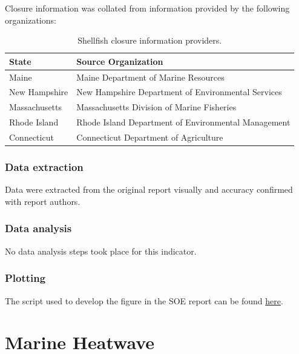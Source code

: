 \documentclass[
]{book}
\begin{document}
Closure information was collated from information provided by the following organizations:

\begin{table}

\caption{\label{tab:closuresrc}Shellfish closure information providers.}
\centering
\begin{tabular}[t]{ll}
\toprule
State & Source Organization\\
\midrule
Maine & Maine Department of Marine Resources\\
New Hampshire & New Hampshire Department of Environmental Services\\
Massachusetts & Massachusetts Division of Marine Fisheries\\
Rhode Island & Rhode Island Department of Environmental Management\\
Connecticut & Connecticut Department of Agriculture\\
\bottomrule
\end{tabular}
\end{table}

\hypertarget{data-extraction-21}{%
\subsection{Data extraction}\label{data-extraction-21}}

Data were extracted from the original report visually and accuracy confirmed with report authors.

\hypertarget{data-analysis-21}{%
\subsection{Data analysis}\label{data-analysis-21}}

No data analysis steps took place for this indicator.

\hypertarget{plotting-16}{%
\subsection{Plotting}\label{plotting-16}}

The script used to develop the figure in the SOE report can be found \href{https://github.com/NOAA-EDAB/tech-doc/tree/master/R/stored_scripts/ne_hab_plotting.R}{here}.

\hypertarget{marine-heatwave}{%
\chapter{Marine Heatwave}\label{marine-heatwave}}
\end{document}
